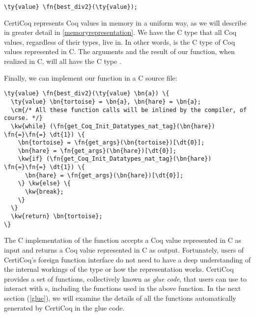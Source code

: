 \begin{Verbatim}
\ty{value} \fn{best_div2}(\ty{value});
\end{Verbatim}

CertiCoq represents Coq values in memory in a uniform way, as we will describe in greater detail in \autoref{memoryrepresentation}. We have the C type  that all Coq values, regardless of their types, live in. In other words,  is the C type of Coq values represented in C. The arguments and the result of our function, when realized in C, will all have the C type .

Finally, we can implement our function in a C source file:

\begin{Verbatim}
\ty{value} \fn{best_div2}(\ty{value} \bn{a}) \{
  \ty{value} \bn{tortoise} = \bn{a}, \bn{hare} = \bn{a};
  \cm{/* All these function calls will be inlined by the compiler, of course. */}
  \kw{while} (\fn{get_Coq_Init_Datatypes_nat_tag}(\bn{hare}) \fn{=}\fn{=} \dt{1}) \{
    \bn{tortoise} = \fn{get_args}(\bn{tortoise})[\dt{0}];
    \bn{hare} = \fn{get_args}(\bn{hare})[\dt{0}];
    \kw{if} (\fn{get_Coq_Init_Datatypes_nat_tag}(\bn{hare}) \fn{=}\fn{=} \dt{1}) \{
      \bn{hare} = \fn{get_args}(\bn{hare})[\dt{0}];
    \} \kw{else} \{
      \kw{break};
    \}
  \}
  \kw{return} \bn{tortoise};
\}
\end{Verbatim}


The C implementation of the function accepts a Coq value represented in C as input and returns a Coq value represented in C as output. Fortunately, users of CertiCoq's foreign function interface do not need to have a deep understanding of the internal workings of the  type or how the representation works. CertiCoq provides a set of functions, collectively known as \emph{\gls{glue code}}, that users can use to interact with s, including the functions used in the above function. In the next section (\autoref{glue}), we will examine the details of all the functions automatically generated by CertiCoq in the glue code.

